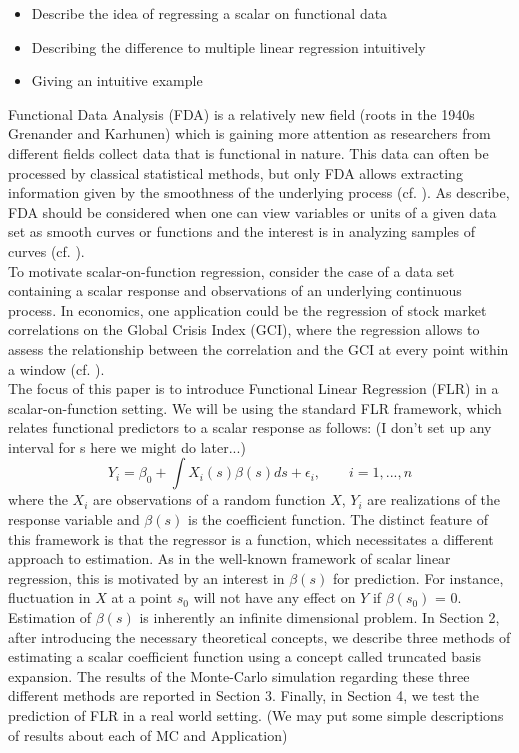 \documentclass[11pt,twoside,a4paper]{article}
\begin{document}
	\begin{itemize}
		\item Describe the idea of regressing a scalar on functional data
		\item Describing the difference to multiple linear regression intuitively
		\item Giving an intuitive example
	\end{itemize}	
	Functional Data Analysis (FDA) is a relatively new field {\color{red} (roots in the 1940s Grenander and Karhunen)} which is gaining more attention as researchers from different fields collect data that is functional in nature. This data can often be processed by classical statistical methods, but only FDA allows extracting information given by the smoothness of the underlying process (cf. \cite{levitin_introduction_2007}).
	 As \cite{kokoszka_introduction_2017} describe, FDA should be considered when one can view variables or units of a given data set as smooth curves or functions and the interest is in analyzing samples of curves (cf. \cite[S.~17]{kokoszka_introduction_2017}).\\
	 To motivate scalar-on-function regression, consider the case of a data set containing a scalar response and observations of an underlying continuous process. In economics, one application could be the regression of stock market correlations on the Global Crisis Index (GCI), where the regression allows to assess the relationship between the correlation and the GCI at every point within a window (cf. \cite{Das_2019}).\\
	 The focus of this paper is to introduce Functional Linear Regression (FLR) in a scalar-on-function setting. We will be using the standard FLR framework, which relates functional predictors to a scalar response as follows:  {\color{red} (I don't set up any interval for s here we might do later...)}
	 \begin{equation}
	 	Y_{i} = \beta_{0} + \int{X_{i}(s)\beta(s)ds} + \epsilon_{i},
	 	\qquad i = 1, ..., n
	 \end{equation}
	 where the $X_{i}$ are observations of a random function $X$, $Y_i$ are realizations of the response variable and $\beta(s)$ is the coefficient function. The distinct feature of this framework is that the regressor is a function, which necessitates a different approach to estimation. As in the well-known framework of scalar linear regression, this is motivated by an interest in $\beta(s)$ for prediction. For instance, fluctuation in $X$ at a point $s_0$ will not have any effect on $Y$ if $\beta(s_0)$ = 0. \\
	 Estimation of $\beta(s)$ is inherently an infinite dimensional problem. In Section 2, after introducing the necessary theoretical concepts, we describe three methods of estimating a scalar coefficient function using a concept called truncated basis expansion. The results of the Monte-Carlo simulation regarding these three different methods are reported in Section 3. Finally, in Section 4, we test the prediction of FLR in a real world setting. {\color{red} (We may put some simple descriptions of results about each of MC and Application)}
\end{document}
